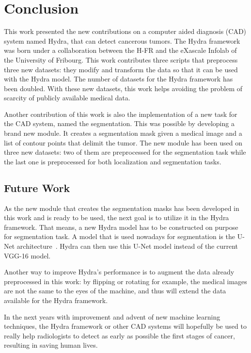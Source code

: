 
\chapter{Conclusion}
\label{ch:conclusion}

This work presented the new contributions on a computer aided diagnosis (CAD) system named Hydra, that can detect cancerous tumors. The Hydra framework was born under a collaboration between the H-FR and the eXascale Infolab of the University of Fribourg. This work contributes three scripts that preprocess three new datasets: they modify and transform the data so that it can be used with the Hydra model. The number of datasets for the Hydra framework has been doubled. With these new datasets, this work helps avoiding the problem of scarcity of publicly available medical data.

Another contribution of this work is also the implementation of a new task for the CAD system, named the segmentation. This was possible by developing a brand new module. It creates a segmentation mask given a medical image and a list of contour points that delimit the tumor. The new module has been used on three new datasets: two of them are preprocessed for the segmentation task while the last one is preprocessed for both localization and segmentation tasks.


\section{Future Work}
As the new module that creates the segmentation masks has been developed in this work and is ready to be used, the next goal is to utilize it in the Hydra framework. That means, a new Hydra model has to be constructed on purpose for segmentation task. A model that is used nowadays for segmentation is the U-Net architecture~\cite{navab_u-net_2015}. Hydra can then use this U-Net model instead of the current VGG-16 model.

Another way to improve Hydra's performance is to augment the data already preprocessed in this work: by flipping or rotating for example, the medical images are not the same to the eyes of the machine, and thus will extend the data available for the Hydra framework.

In the next years with improvement and advent of new machine learning techniques, the Hydra framework or other CAD systems will hopefully be used to really help radiologists to detect as early as possible the first stages of cancer, resulting in saving human lives.
